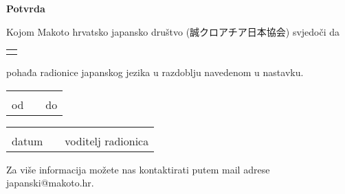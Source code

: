 
\author{Tomislav Mamić}

	
	\centering
	\vspace*{20pt}
	\Huge \textbf{Potvrda}
	
	\large\vspace{100pt}
	Kojom Makoto hrvatsko japansko društvo (誠クロアチア日本協会) svjedoči da
	
	\vspace{50pt}
	\begin{tabular}{p{200pt}}
		\hline
		\centering\small
	\end{tabular}

	\vspace{20pt}
	\large pohađa radionice japanskog jezika u razdoblju navedenom u nastavku.
	
	\vspace{50pt}\small
	\begin{tabular}{p{150pt} p{50pt} p{150pt}}
		&&\\\cline{1-1}\cline{3-3}
		\centering od&&\centering do\\
	\end{tabular}

	\vspace{150pt}\small
	\begin{tabular}{p{150pt} p{50pt} p{150pt}}
		&&\\\cline{1-1}\cline{3-3}
		\centering datum&&\centering voditelj radionica\\
	\end{tabular}
	
	\vspace{30pt}
	Za više informacija možete nas kontaktirati putem mail adrese japanski@makoto.hr.
